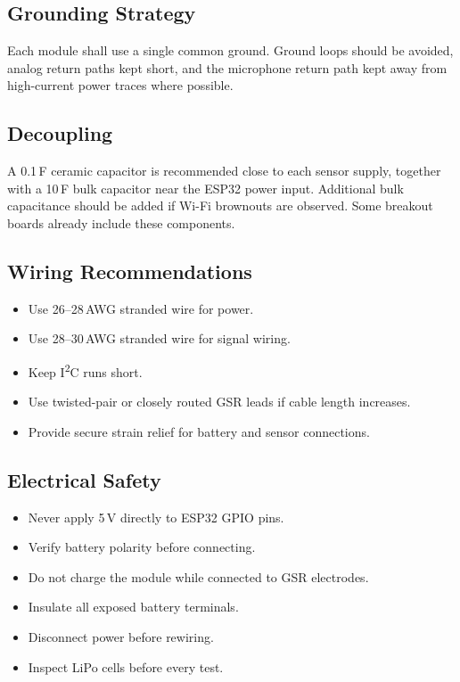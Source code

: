 \subsection{Grounding Strategy}
\label{sec:grounding-strategy}

\begin{engnote}
Each module shall use a single common ground. Ground loops should be avoided, analog return paths kept short, and the microphone return path kept away from high-current power traces where possible.
\end{engnote}

\subsection{Decoupling}
\label{sec:decoupling}

\begin{designnote}
A 0.1\,\textmu F ceramic capacitor is recommended close to each sensor supply, together with a 10\,\textmu F bulk capacitor near the ESP32 power input. Additional bulk capacitance should be added if Wi-Fi brownouts are observed. Some breakout boards already include these components.
\end{designnote}

\subsection{Wiring Recommendations}
\label{sec:wiring-recommendations}

\begin{itemize}
    \item Use 26--28\,AWG stranded wire for power.
    \item Use 28--30\,AWG stranded wire for signal wiring.
    \item Keep I\textsuperscript{2}C runs short.
    \item Use twisted-pair or closely routed GSR leads if cable length increases.
    \item Provide secure strain relief for battery and sensor connections.
\end{itemize}

\subsection{Electrical Safety}
\label{sec:electrical-safety}

\begin{warningbox}
\begin{itemize}
    \item Never apply 5\,V directly to ESP32 GPIO pins.
    \item Verify battery polarity before connecting.
    \item Do not charge the module while connected to GSR electrodes.
    \item Insulate all exposed battery terminals.
    \item Disconnect power before rewiring.
    \item Inspect LiPo cells before every test.
\end{itemize}
\end{warningbox}

